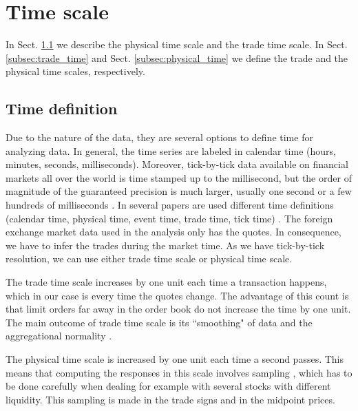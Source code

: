 \section{Time scale}\label{sec:time_scale}

In Sect. \ref{subsec:time_definition} we describe the physical time scale and
the trade time scale. In Sect. \ref{subsec:trade_time} and Sect.
\ref{subsec:physical_time} we define the trade and the physical time scales,
respectively.

\subsection{Time definition}\label{subsec:time_definition}

Due to the nature of the data, they are several options to define time for
analyzing data. In general, the time series are labeled in calendar time
(hours, minutes, seconds, milliseconds). Moreover, tick-by-tick data available
on financial markets all over the world is time stamped up to the millisecond,
but the order of magnitude of the guaranteed precision is much larger, usually
one second or a few hundreds of milliseconds
\cite{market_digest,empirical_facts}. In several papers are used different time
definitions (calendar time, physical time, event time, trade time, tick time)
\cite{empirical_facts,sampling_returns,market_making}. The foreign exchange
market data used in the analysis only has the quotes. In consequence, we have
to infer the trades during the market time. As we have tick-by-tick resolution,
we can use either trade time scale or physical time scale.

The trade time scale increases by one unit each time a transaction happens,
which in our case is every time the quotes change. The advantage of this count
is that limit orders far away in the order book do not increase the time by one
unit. The main outcome of trade time scale is its ``smoothing" of data and the
aggregational normality \cite{empirical_facts}.

The physical time scale is increased by one unit each time a second passes.
This means that computing the responses in this scale involves sampling
\cite{sampling_returns,Wang_2016_cross}, which has to be done carefully when
dealing for example with several stocks with different liquidity. This sampling
is made in the trade signs and in the midpoint prices.

